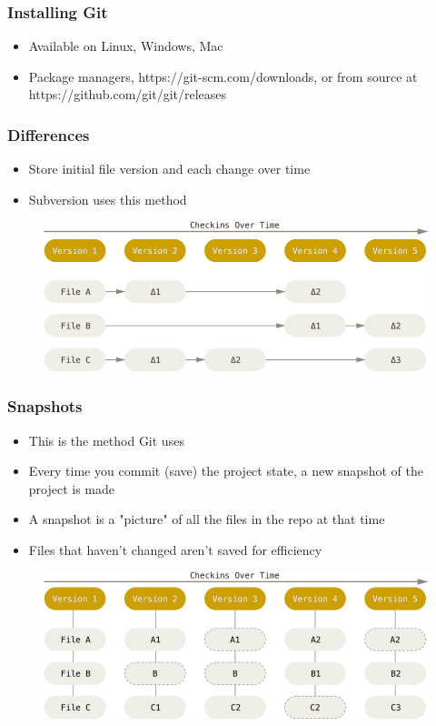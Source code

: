\documentclass{beamer}
\begin{document}
\begin{frame}
	\frametitle{Installing Git}
	\begin{itemize}
		\item{Available on Linux, Windows, Mac}
		\item{Package managers, https://git-scm.com/downloads, or from source at https://github.com/git/git/releases}
	\end{itemize}
\end{frame}

\begin{frame}
	\frametitle{Differences}
	\begin{itemize}
		\item{Store initial file version and each change over time}
		\item{Subversion uses this method}
	\end{itemize}
	\begin{figure}
		\includegraphics[scale=0.3]{Differences-0.png}
	\end{figure}

\end{frame}

\begin{frame}
	\frametitle{Snapshots}
	\begin{itemize}
		\item{This is the method Git uses}
		\item{Every time you commit (save) the project state, a new snapshot of the project is made}
		\item{A snapshot is a "picture" of all the files in the repo at that time}
		\item{Files that haven't changed aren't saved for efficiency}
	\end{itemize}
	\begin{figure}
		\includegraphics[scale=0.3]{Snapshots-0.png}
	\end{figure}

\end{frame}
\end{document}
